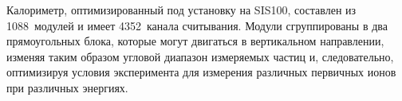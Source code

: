 \begin{minipage}[t]{0.495\textwidth}
Калориметр, оптимизированный под установку на SIS100, составлен из 1088~модулей и имеет 4352~канала считывания. Модули сгруппированы в два прямоугольных блока, которые могут двигаться в вертикальном направлении, изменяя таким образом угловой диапазон измеряемых частиц и, следовательно, оптимизируя условия эксперимента для измерения различных первичных ионов при различных энергиях. \\
\end{minipage}

